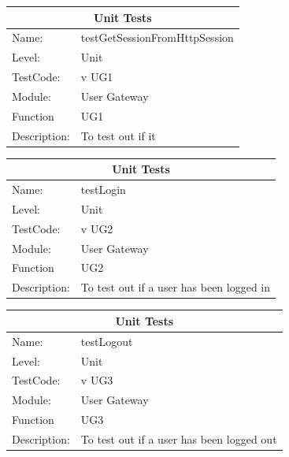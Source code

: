 \documentclass[12pt]{article}
\begin{document}
\begin{center}
\begin{tabular}{|l|p{12cm}|}
\hline
\multicolumn{2}{|c|}{\bf Unit Tests} \\
\hline
 Name: & testGetSessionFromHttpSession \\
\hline
Level: & Unit \\
\hline
TestCode: & v UG1 \\
\hline
Module:& User Gateway\\
\hline
Function & UG1 \\
\hline
Description: & To test out if it  \\
\hline

\end{tabular}
\end{center}

\begin{center}
\begin{tabular}{|l|p{12cm}|}
\hline
\multicolumn{2}{|c|}{\bf Unit Tests} \\
\hline
 Name: & testLogin\\
\hline
Level: & Unit \\
\hline
TestCode: & v UG2 \\
\hline
Module:& User Gateway\\
\hline
Function & UG2 \\
\hline
Description: & To test out if a user has been logged in \\
\hline

\end{tabular}
\end{center}


\begin{center}
\begin{tabular}{|l|p{12cm}|}
\hline
\multicolumn{2}{|c|}{\bf Unit Tests} \\
\hline
 Name: & testLogout\\
\hline
Level: & Unit \\
\hline
TestCode: & v UG3 \\
\hline
Module:& User Gateway\\
\hline
Function & UG3 \\
\hline
Description: & To test out if a user has been logged out \\
\hline

\end{tabular}
\end{center}
\end{document}
